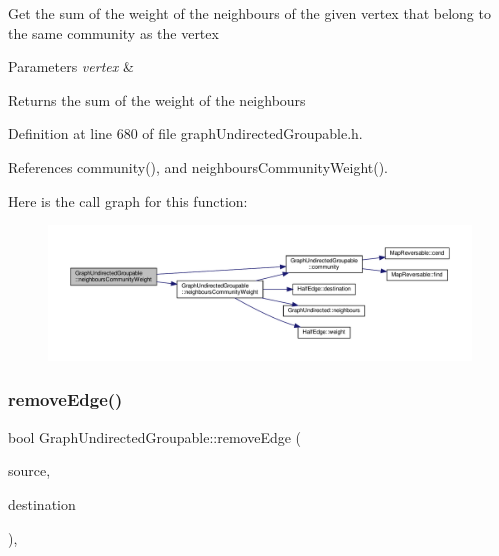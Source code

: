 Get the sum of the weight of the neighbours of the given vertex that belong to the same community as the vertex


\begin{DoxyParams}{Parameters}
{\em vertex} & \\
\hline
\end{DoxyParams}
\begin{DoxyReturn}{Returns}
the sum of the weight of the neighbours 
\end{DoxyReturn}


Definition at line 680 of file graph\+Undirected\+Groupable.\+h.



References community(), and neighbours\+Community\+Weight().

Here is the call graph for this function\+:
\nopagebreak
\begin{figure}[H]
\begin{center}
\leavevmode
\includegraphics[width=350pt]{classGraphUndirectedGroupable_a41c4955a6238924a861fe18e8d7a9ee9_cgraph}
\end{center}
\end{figure}
\mbox{\label{classGraphUndirectedGroupable_ad1a488cc292d7e63d289f598aeaaacd6}} 
\subsubsection{\texorpdfstring{remove\+Edge()}{removeEdge()}\hspace{0.1cm}{\footnotesize\ttfamily [1/2]}}
{\footnotesize\ttfamily bool Graph\+Undirected\+Groupable\+::remove\+Edge (\begin{DoxyParamCaption}\item[{const \hyperlink{edge_8h_a5fbd20c46956d479cb10afc9855223f6}{type\+Vertex} \&}]{source,  }\item[{const \hyperlink{edge_8h_a5fbd20c46956d479cb10afc9855223f6}{type\+Vertex} \&}]{destination }\end{DoxyParamCaption})\hspace{0.3cm}{\ttfamily [inline]}, {\ttfamily [virtual]}}

